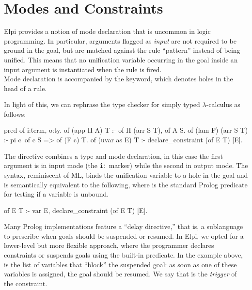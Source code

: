 \documentclass[a4paper, 11pt]{book}
\begin{document}
\section{Modes and Constraints}\label{sec:modes}


Elpi provides a notion of mode declaration that is uncommon in logic
programming. In particular, arguments flagged as \emph{input} are not required to be
ground in the goal, but are matched against the rule ``pattern'' instead of
being unified. This means that no unification variable occurring in the goal
inside an input argument is instantiated when the rule is fired.
~\\

Mode declaration is accompanied by the  keyword, which denotes
holes in the head of a rule.

In light of this, we can rephrase the type checker for simply typed
$\lambda$-calculus as follows:

\begin{elpicode}
pred of i:term, o:ty.
of (app H A) T :- of H (arr S T), of A S.
of (lam F) (arr S T) :- pi c\ of c S => of (F c) T.
of (uvar as E) T :- declare_constraint (of E T) [E].
\end{elpicode}

The  directive combines a type and mode declaration,
in this case the first argument is in input mode (the \texttt{i:} marker)
while the second in output mode.
The  syntax, reminiscent of ML,
binds the unification variable  to a hole in the
goal and is semantically equivalent to the following, where  is
the standard Prolog predicate for testing if a variable is unbound.
\begin{elpicode}
of E T :- var E, declare_constraint (of E T) [E].
\end{elpicode}

Many Prolog implementations feature a ``delay directive,'' that is, a
sublanguage to prescribe when goals should be suspended or resumed. In Elpi,
we opted for a lower-level but more flexible approach, where the programmer
declares constraints or suspends goals using the 
built-in predicate. In the example above, \elpi{[E]} is the list of variables
that ``block'' the suspended goal: as soon as one of these variables is
assigned, the goal should be resumed. We say that  is the \emph{trigger} of
the constraint.
\end{document}

